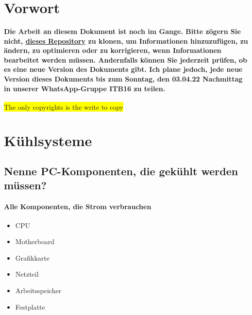 \documentclass[a4paper]{article}
\begin{document}
    \begin{titlepage}
        
    \end{titlepage}

    
    \section{Vorwort}\label{sec:einführung}
    \paragraph{Die Arbeit an diesem Dokument ist noch im Gange. Bitte zögern Sie nicht, \href{https://github.com/amermmohammed/LF2_Klausurvorbereitung}{dieses Repository} zu klonen, um Informationen hinzuzufügen, zu ändern, zu optimieren oder zu korrigieren, wenn Informationen bearbeitet werden müssen. Andernfalls können Sie jederzeit prüfen, ob es eine neue Version des Dokuments gibt. Ich plane jedoch, jede neue Version dieses Dokuments bis zum Sonntag, den 03.04.22 Nachmittag in unserer WhatsApp-Gruppe ITB16 zu teilen.}
    \begin{center}
        \color{red}
        \colorbox{yellow}{The only copyrights is the write to copy}
    \end{center}
    \newpage
    \tableofcontents
    \newpage
    
    \section{Kühlsysteme}\label{sec:kuehlsysteme}

    \subsection{\color{red}Nenne PC-Komponenten, die gekühlt werden müssen?}\label{subsec:color{red}nenne-pc-komponenten-die-gekühlt-werden-müssen?}

    \paragraph{\color{codegreen}Alle Komponenten, die Strom verbrauchen}
    \begin{itemize}
        \color{magenta}
        \item CPU
        \item Motherboard
        \item Grafikkarte
        \item Netzteil
        \item Arbeitsspeicher
        \item Festplatte
    \end{itemize}
\end{document}
